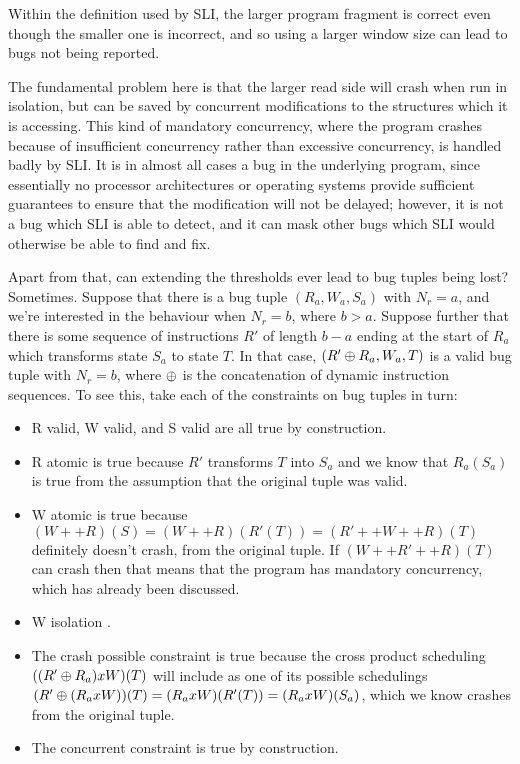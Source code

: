 \documentclass[12pt,a4paper]{book}
\begin{document}
Within the definition used by SLI, the larger program fragment is correct even though the smaller one is incorrect, and so using a larger window size can lead to bugs not being reported.

The fundamental problem here is that the larger read side will crash when run in isolation, but can be saved by concurrent modifications to the structures which it is accessing.
This kind of mandatory concurrency, where the program crashes because of insufficient concurrency rather than excessive concurrency, is handled badly by SLI.
It is in almost all cases a bug in the underlying program, since essentially no processor architectures or operating systems provide sufficient guarantees to ensure that the modification will not be delayed; however, it is not a bug which SLI is able to detect, and it can mask other bugs which SLI would otherwise be able to find and fix.


Apart from that, can extending the thresholds ever lead to bug tuples being lost?
Sometimes.
Suppose that there is a bug tuple $(R_a, W_a, S_a)$ with $N_r = a$, and we're interested in the behaviour when $N_r = b$, where $b > a$.
Suppose further that there is some sequence of instructions $R'$ of length $b - a$ ending at the start of $R_a$ which transforms state $S_a$ to state $T$.
In that case, $(R' \oplus R_a, W_a, T)$ is a valid bug tuple with $N_r = b$, where $\oplus$ is the concatenation of dynamic instruction sequences.
To see this, take each of the constraints on bug tuples in turn:

\begin{itemize}
\item R valid, W valid, and S valid are all true by construction.
\item R atomic is true because $R'$ transforms $T$ into $S_a$ and we know that $R_a(S_a)$ is true from the assumption that the original tuple was valid.
\item
  W atomic is true because $(W ++ R)(S) = (W ++ R)(R'(T)) = (R' ++ W ++ R)(T)$ definitely doesn't crash, from the original tuple.
  If $(W ++ R' ++ R)(T)$ can crash then that means that the program has mandatory concurrency, which has already been discussed.
\item
  W isolation .
\item
  The crash possible constraint is true because the cross product scheduling $((R' \oplus R_a) x W)(T)$ will include as one of its possible schedulings $(R' \oplus (R_a x W))(T) = (R_a x W)(R'(T)) = (R_a x W)(S_a)$, which we know crashes from the original tuple.
\item
  The concurrent constraint is true by construction.
\end{itemize}
\end{document}
